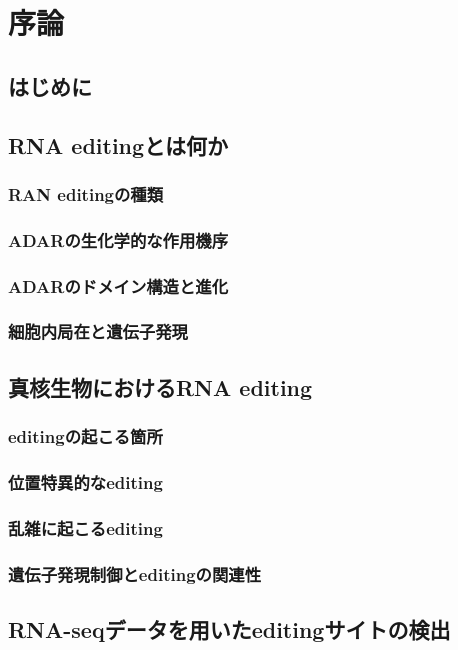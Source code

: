 
\chapter{序論}
\section{はじめに}

\section{RNA editingとは何か}
\subsection{RAN editingの種類}
\subsection{ADARの生化学的な作用機序}
\subsection{ADARのドメイン構造と進化}
\subsection{細胞内局在と遺伝子発現}

\section{真核生物におけるRNA editing}
\subsection{editingの起こる箇所}
\subsection{位置特異的なediting}
\subsection{乱雑に起こるediting}
\subsection{遺伝子発現制御とeditingの関連性}

\section{RNA-seqデータを用いたeditingサイトの検出}
\subsection{}